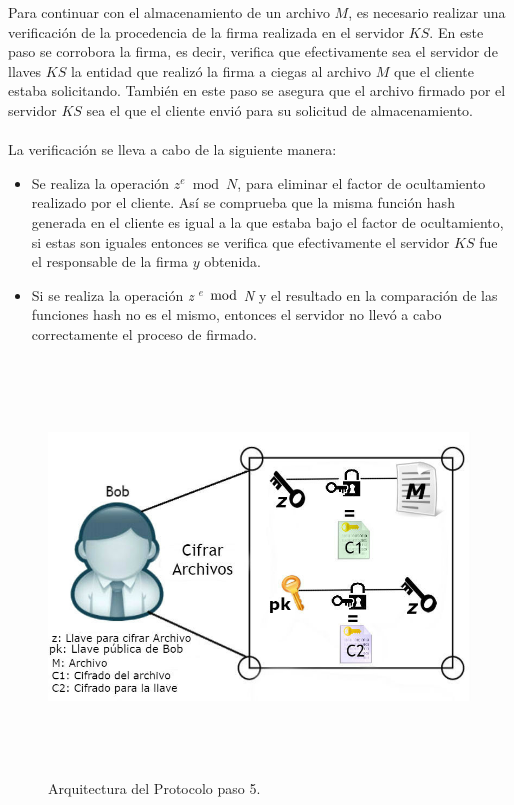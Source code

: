 Para continuar con el almacenamiento de un archivo $M$, es necesario realizar una verificación de la procedencia de la firma realizada en el servidor $KS$. En este paso se corrobora la firma, es decir, verifica que efectivamente sea el servidor de llaves $KS$ la entidad que realizó la firma a ciegas al archivo $M$ que el cliente estaba solicitando. También en este paso se asegura que el archivo firmado por el servidor $KS$ sea el que el cliente envió para su solicitud de almacenamiento. \\ \\
La verificación se lleva a cabo de la siguiente manera: 
\begin{itemize}
\item Se realiza la operación $z^e \bmod N $, para eliminar el factor de ocultamiento realizado por el cliente. Así se comprueba que la misma función hash generada en el cliente es igual a la que estaba bajo el factor de ocultamiento, si estas son iguales entonces se verifica que efectivamente el servidor $KS$ fue el responsable de la firma $y$ obtenida. 
\item Si se realiza la operación \textit{z $^e$ $\bmod$ N} y el resultado en la comparación de las funciones hash no es el mismo, entonces el servidor no llevó a cabo correctamente el proceso de firmado.

\end{itemize}


\begin{figure}[H]
\centering
\includegraphics[width=16cm, height=11cm]{./images/Paso04.jpg}
\caption{Arquitectura del Protocolo paso 5.}

\end{figure}

